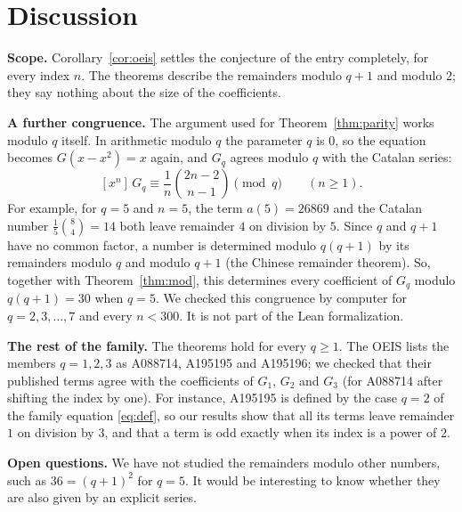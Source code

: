 \documentclass[11pt,a4paper]{article}
\theoremstyle{definition}
\theoremstyle{remark}
\newcommand{\coeff}[2]{[x^{#1}]\,#2}
\newcommand{\para}[1]{\par\medskip\noindent\textbf{#1}\enspace}
\begin{document}
\section{Discussion}\label{sec:discussion}

\para{Scope.} Corollary~\ref{cor:oeis} settles the conjecture of the entry completely,
for every index $n$. The theorems describe the remainders modulo $q+1$ and modulo $2$; they say nothing about the size
of the coefficients.

\para{A further congruence.} The argument used for Theorem~\ref{thm:parity} works modulo $q$ itself. In arithmetic
modulo $q$ the parameter $q$ is $0$, so the equation becomes $G(x-x^2)=x$ again, and $G_q$ agrees modulo $q$ with the
Catalan series:
\[
\coeff{n}{G_q}\equiv\frac{1}{n}\binom{2n-2}{n-1}\pmod q\qquad(n\ge1).
\]
For example, for $q=5$ and $n=5$, the term $a(5)=26869$ and the Catalan number $\frac15\binom84=14$ both leave remainder $4$ on division by $5$. Since $q$ and $q+1$ have no common factor, a number is determined modulo $q(q+1)$ by its
remainders modulo $q$ and modulo $q+1$ (the Chinese remainder theorem). So, together with Theorem~\ref{thm:mod}, this
determines every coefficient of $G_q$ modulo $q(q+1)=30$ when $q=5$. We checked
this congruence by computer for $q=2,3,\dots,7$ and every $n<300$. It is not part of the Lean formalization.

\para{The rest of the family.} The theorems hold for every $q\ge1$. The OEIS lists the members $q=1,2,3$ as A088714,
A195195 and A195196; we checked that their published terms agree with the coefficients of $G_1$, $G_2$ and $G_3$ (for
A088714 after shifting the index by one). For instance, A195195 is defined by the case $q=2$ of
the family equation \eqref{eq:def}, so our results show that all its terms leave remainder $1$ on division by $3$, and that a term is odd
exactly when its index is a power of $2$.

\para{Open questions.} We have not studied the remainders modulo other numbers, such as $36=(q+1)^2$
for $q=5$. It would be interesting to know whether they are also given by an explicit series.
\end{document}
